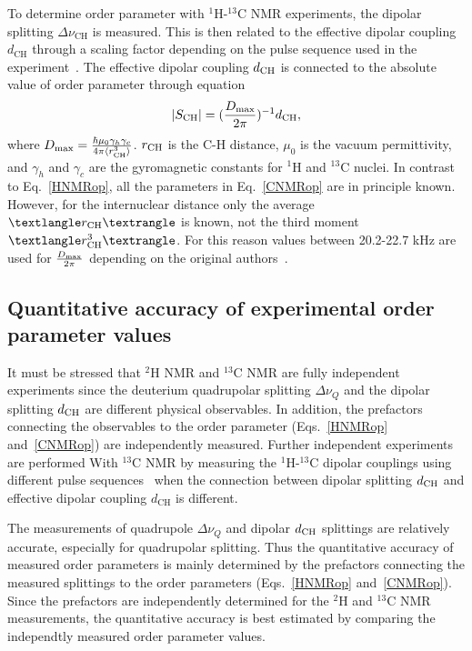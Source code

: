 \documentclass[aps,prl,superscriptaddress,twocolumn]{revtex4}
\begin{document}
To determine order parameter with $^1$H-$^{13}$C NMR experiments, the dipolar splitting $\Delta \nu_\mathrm{CH}$  is measured. This is then related to
the effective dipolar coupling $d_\mathrm{CH}$ through a scaling factor depending on the pulse sequence used in the 
experiment~\cite{hong95a,gross97,dvinskikh05a,ferreira13}. The effective dipolar coupling $d_{{\rm CH}}$ is 
connected to the absolute value of order parameter through equation
\begin{equation}\label{CNMRop}
|S_{{\rm CH}}|=(\frac{D_{{\rm max}}}{2\pi})^{-1}d_\mathrm{CH},
\end{equation}
where $D_{{\rm max}} = \frac{\hbar \mu_0 \gamma_h \gamma_c}{4\pi\langle r_\mathrm{CH}^3 \rangle}$. 
$r_{{\rm CH}}$ is the C-H distance, $\mu_0$ is the vacuum permittivity, and $\gamma_h$ and $\gamma_c$ are 
the gyromagnetic constants for $^1$H and $^{13}$C nuclei. In contrast to Eq.~\ref{HNMRop}, all the parameters in 
Eq.~\ref{CNMRop} are in principle known. However, for the internuclear distance only the average $⟨r_{{\rm CH}}⟩$ 
is known, not the third moment $⟨r^3_{{\rm CH}}⟩$. For this reason values between 20.2-22.7 kHz are used for
$\frac{D_{{\rm max}}}{2\pi}$ depending on the original authors~\cite{hong95a,gross97,dvinskikh05a,becker06,ferreira13,ferreira15}.

\subsection{Quantitative accuracy of experimental order parameter values}\label{QUANTaccuracySECTION}

It must be stressed that $^2$H NMR and $^{13}$C NMR are fully independent experiments since the deuterium quadrupolar splitting $\Delta \nu_Q$
and the dipolar splitting $d_{{\rm CH}}$ are different physical observables. In addition, the prefactors connecting the observables to the order 
parameter (Eqs.~\ref{HNMRop} and~\ref{CNMRop}) are independently measured. Further independent experiments are performed With $^{13}$C NMR 
by measuring the $^1$H-$^{13}$C dipolar couplings using different pulse sequences~\cite{hong95a,gross97,dvinskikh05a,ferreira13} when the connection
between dipolar splitting $d_{{\rm CH}}$ and effective dipolar coupling $d_\mathrm{CH}$ is different.

The measurements of quadrupole $\Delta \nu_Q$ and dipolar $d_{{\rm CH}}$ splittings are relatively accurate, especially for quadrupolar splitting.
Thus the quantitative accuracy of measured order parameters is mainly determined by the  
prefactors connecting the measured splittings to the order parameters (Eqs.~\ref{HNMRop} and~\ref{CNMRop}). 
Since the prefactors are independently determined for the $^2$H and $^{13}$C NMR measurements,
the quantitative accuracy is best estimated by comparing the independtly measured order parameter values.
\end{document}
